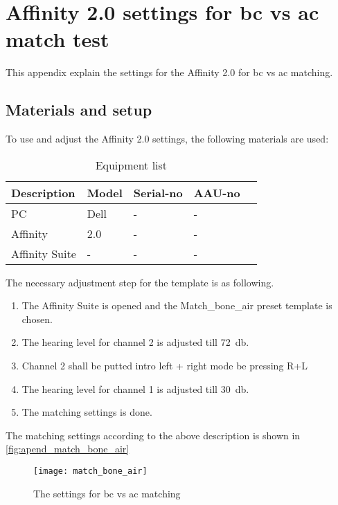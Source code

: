 \chapter{Affinity 2.0 settings for \gls{bc} vs \gls{ac} match test}
\label{apend:aff_bc_ac_match}
This appendix explain the settings for the Affinity 2.0 for \gls{bc} vs \gls{ac} matching.

\section*{Materials and setup}
To use and adjust the Affinity 2.0 settings, the following materials are used:


\begin{table}[H]
\centering
\caption{Equipment list}
\begin{tabular}{l|l|l|l l}
Description         	& Model                                        & Serial-no  						& AAU-no \\ \hline
PC        			 		& Dell                                   & -  			& -  \\
Affinity     				& 2.0                            				& -   									& -  \\
Affinity Suite			& -                            				& -   									& - 
\end{tabular}
\end{table}

The necessary adjustment step for the template is as following.

\begin{enumerate}
\item The Affinity Suite is opened and the Match_bone_air preset template is chosen.
\item The hearing level for channel 2 is adjusted till \SI{72}{\decibel}.
\item  Channel 2 shall be putted intro left + right mode be pressing R+L
\item  The hearing level for channel 1 is adjusted till \SI{30}{\decibel}.
\item The matching settings is done.
\end{enumerate}

The matching settings according to the above description is shown in \autoref{fig:apend_match_bone_air}

\begin{figure}[H]
	\centering
		\texttt{[image: match\_bone\_air]}
		\caption{The settings for  \gls{bc} vs \gls{ac} matching}
		\label{fig:apend_match_bone_air}
\end{figure}





